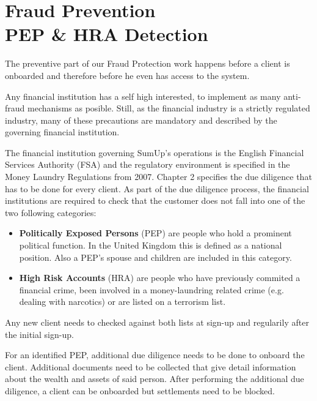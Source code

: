 \documentclass[a4paper, oneside]{csthesis}
\begin{document}


\chapter{Fraud Prevention \\PEP \& HRA Detection}

The preventive part of our Fraud Protection work happens before a client is onboarded and therefore before he even has access to the system.

Any financial institution has a self high interested, to implement as many anti-fraud mechanisms as posible. Still, as  the financial industry is a strictly regulated industry, many of these precautions are mandatory and described by the governing financial institution.

The financial institution governing SumUp's operations is the English Financial Services Authority (FSA) and the regulatory environment is specified in the Money Laundry Regulations from 2007\cite{website:aml-regulations-2007}. Chapter 2 specifies the due diligence that has to be done for every client. As part of the due diligence process, the financial institutions are required to check that the customer does not fall into one of the two following categories:

\begin{itemize}
\item \textbf{Politically Exposed Persons} (PEP) are people who hold a prominent political function. In the United Kingdom this is defined as a national position. Also a PEP's spouse and children are included in this category.

\item \textbf{High Risk Accounts} (HRA) are people who have previously commited a financial crime, been involved in a money-laundring related crime (e.g. dealing with narcotics) or are listed on a terrorism list.

\end{itemize}

Any new client needs to checked against both lists at sign-up and regularily after the initial sign-up.

For an identified PEP, additional due diligence needs to be done to onboard the client. Additional documents need to be collected that give detail information about the wealth and assets of said person. After performing the additional due diligence, a client can be onboarded but settlements need to be blocked.
\end{document}
